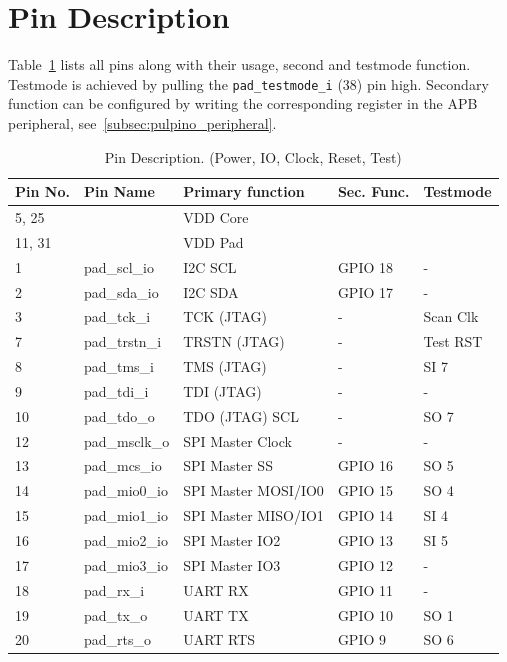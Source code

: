 \section{Pin Description}
Table~\ref{tab:pins} lists all pins along with their usage, second and testmode function. Testmode is achieved by pulling the \verb+pad_testmode_i+ (38) pin high. Secondary function can be configured by writing the corresponding register in the \pulpino APB peripheral, see~\ref{subsec:pulpino_peripheral}.
\begin{table}[htbp]
 \caption{Pin Description. (Power, IO, Clock, Reset, Test)}
 \label{tab:pins}
\begin{tabular}{|l|l|l|l|l|}
  \hline
  \textbf{Pin No.} & \textbf{Pin Name} & \textbf{Primary function}& \textbf{Sec. Func.}& \textbf{Testmode}\\ \hline
  5, 25 & & \multicolumn{2}{l}{VDD Core} &\\ \hline
  11, 31 & & \multicolumn{2}{l}{VDD Pad} & \\ \hline
  1 & pad\_scl\_io & I2C SCL & GPIO 18  & - \\ \hline
  2 & pad\_sda\_io & I2C SDA & GPIO 17  & - \\ \hline
  3 & pad\_tck\_i & TCK (JTAG) & -  & Scan Clk \\ \hline
  7 & pad\_trstn\_i & TRSTN (JTAG)& -  & Test RST\\ \hline
  8 & pad\_tms\_i & TMS (JTAG) & -  & SI 7 \\ \hline
  9 & pad\_tdi\_i & TDI (JTAG) & -  & - \\ \hline
  10 & pad\_tdo\_o & TDO (JTAG) SCL & -  & SO 7 \\ \hline
  12 & pad\_msclk\_o & SPI Master Clock & -  & - \\ \hline
  13 & pad\_mcs\_io & SPI Master SS & GPIO 16  & SO 5 \\ \hline
  14 & pad\_mio0\_io & SPI Master MOSI/IO0 & GPIO 15  & SO 4 \\ \hline
  15 & pad\_mio1\_io & SPI Master MISO/IO1 & GPIO 14  & SI 4 \\ \hline
  16 & pad\_mio2\_io & SPI Master IO2 & GPIO 13  & SI 5 \\ \hline
  17 & pad\_mio3\_io & SPI Master IO3 & GPIO 12  & - \\ \hline
  18 & pad\_rx\_i & UART RX & GPIO 11  & - \\ \hline
  19 & pad\_tx\_o & UART TX & GPIO 10  & SO 1 \\ \hline
  20 & pad\_rts\_o & UART RTS & GPIO 9  & SO 6 \\ \hline

\end{tabular}
\end{table}

